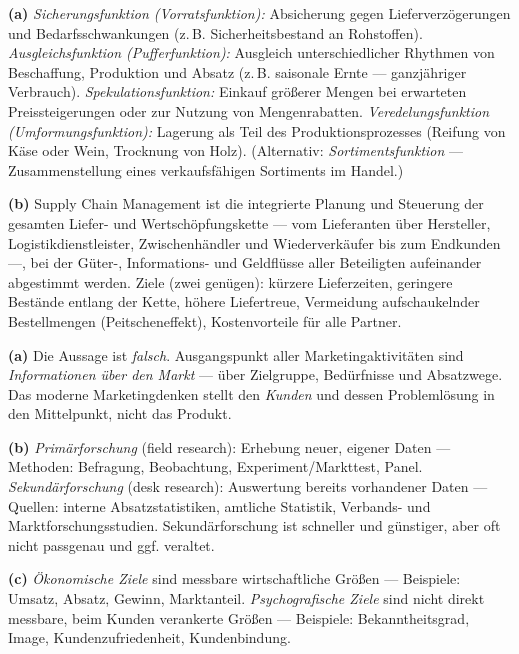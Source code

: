 \documentclass[11pt, a4paper]{article}
\begin{document}
\begin{loesung}[title={Lösung Aufgabe~6 --- Lagerfunktionen und SCM}]
\textbf{(a)} \emph{Sicherungsfunktion (Vorratsfunktion):} Absicherung gegen
Lieferverzögerungen und Bedarfsschwankungen (z.\,B. Sicherheitsbestand an Rohstoffen).
\emph{Ausgleichsfunktion (Pufferfunktion):} Ausgleich unterschiedlicher Rhythmen von
Beschaffung, Produktion und Absatz (z.\,B. saisonale Ernte --- ganzjähriger Verbrauch).
\emph{Spekulationsfunktion:} Einkauf größerer Mengen bei erwarteten Preissteigerungen
oder zur Nutzung von Mengenrabatten. \emph{Veredelungsfunktion (Umformungsfunktion):}
Lagerung als Teil des Produktionsprozesses (Reifung von Käse oder Wein, Trocknung von
Holz). (Alternativ: \emph{Sortimentsfunktion} --- Zusammenstellung eines
verkaufsfähigen Sortiments im Handel.)

\textbf{(b)} Supply Chain Management ist die integrierte Planung und Steuerung der
gesamten Liefer- und Wertschöpfungskette --- vom Lieferanten über Hersteller,
Logistikdienstleister, Zwischenhändler und Wiederverkäufer bis zum Endkunden ---, bei
der Güter-, Informations- und Geldflüsse aller Beteiligten aufeinander abgestimmt
werden. Ziele (zwei genügen): kürzere Lieferzeiten, geringere Bestände entlang der
Kette, höhere Liefertreue, Vermeidung aufschaukelnder Bestellmengen
(Peitscheneffekt), Kostenvorteile für alle Partner.
\end{loesung}

\begin{loesung}[title={Lösung Aufgabe~7 --- Marketingbegriff, Marktforschung, Ziele}]
\textbf{(a)} Die Aussage ist \emph{falsch}. Ausgangspunkt aller Marketingaktivitäten
sind \emph{Informationen über den Markt} --- über Zielgruppe, Bedürfnisse und
Absatzwege. Das moderne Marketingdenken stellt den \emph{Kunden} und dessen
Problemlösung in den Mittelpunkt, nicht das Produkt.

\textbf{(b)} \emph{Primärforschung} (field research): Erhebung neuer, eigener Daten ---
Methoden: Befragung, Beobachtung, Experiment/Markttest, Panel.
\emph{Sekundärforschung} (desk research): Auswertung bereits vorhandener Daten ---
Quellen: interne Absatzstatistiken, amtliche Statistik, Verbands- und
Marktforschungsstudien. Sekundärforschung ist schneller und günstiger, aber oft nicht
passgenau und ggf. veraltet.

\textbf{(c)} \emph{Ökonomische Ziele} sind messbare wirtschaftliche Größen ---
Beispiele: Umsatz, Absatz, Gewinn, Marktanteil. \emph{Psychografische Ziele} sind nicht
direkt messbare, beim Kunden verankerte Größen --- Beispiele: Bekanntheitsgrad, Image,
Kundenzufriedenheit, Kundenbindung.
\end{loesung}
\end{document}
